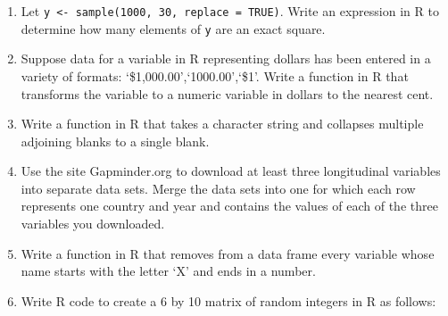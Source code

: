 \documentclass[
]{article}
\begin{document}
\begin{enumerate}
\item
  Let \texttt{y\ \textless{}-\ sample(1000,\ 30,\ replace\ =\ TRUE)}.
  Write an expression in R to determine how many elements of \texttt{y}
  are an exact square. \vspace{0px}
\item
  Suppose data for a variable in R representing dollars has been entered
  in a variety of formats: `\$1,000.00',`1000.00',`\$1'. Write a
  function in R that transforms the variable to a numeric variable in
  dollars to the nearest cent. \vspace{0px}
\item
  Write a function in R that takes a character string and collapses
  multiple adjoining blanks to a single blank. \vspace{0px}
\item
  Use the site Gapminder.org to download at least three longitudinal
  variables into separate data sets. Merge the data sets into one for
  which each row represents one country and year and contains the values
  of each of the three variables you downloaded. \vspace{0px}
\item
  Write a function in R that removes from a data frame every variable
  whose name starts with the letter `X' and ends in a number.
  \vspace{0px}
\item
  Write R code to create a 6 by 10 matrix of random integers in R as
  follows:


\end{enumerate}
\end{document}
